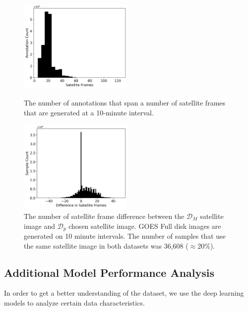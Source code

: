 \documentclass{article}
\begin{document}
\begin{figure}[!htb]
    \parbox{\textwidth}{
      \parbox{0.49\textwidth}{
        \centering
        \includegraphics[width=0.49\textwidth]{stat_figs/sample_count_vs_frames.png}
        \caption{The number of annotations that span a number of satellite frames that are generated at a 10-minute interval.}
        \label{num_frames}
      }
    \hspace{0.01\textwidth}
      \parbox{0.49\textwidth}{
        \centering
        \includegraphics[width=0.49\textwidth]{stat_figs/sample_count_vs_diff_frames.png}
        \caption{The number of satellite frame difference between the \(\mathcal{D}_M\) satellite image and \(\mathcal{D}_p\) chosen satellite image. GOES Full disk images are generated on 10 minute intervals. The number of samples that use the same satellite image in both datasets was 36,608 (\(\approx\)20\%).}
        \label{frame_diff}
      }
    }
\end{figure}


\subsection{Additional Model Performance Analysis}

In order to get a better understanding of the dataset, we use the deep learning models to analyze certain data characteristics. 
\end{document}
